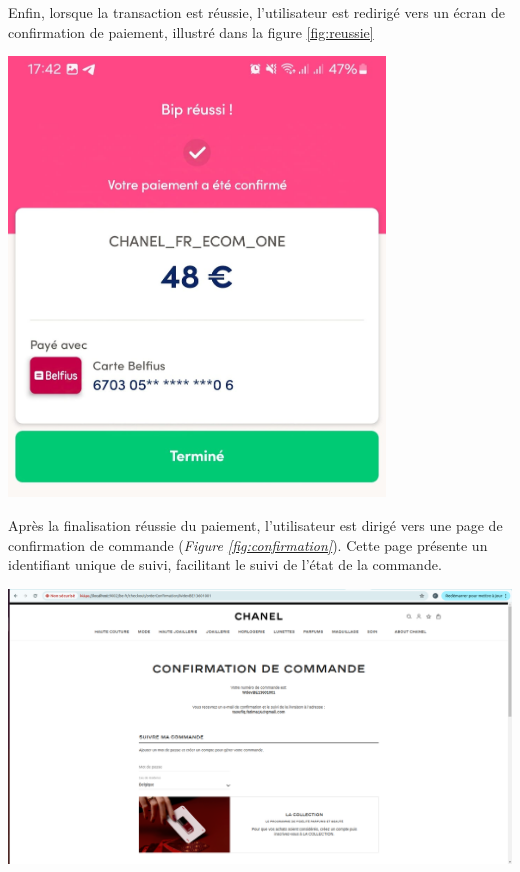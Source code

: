 Enfin, lorsque la transaction est réussie, l'utilisateur est redirigé vers un écran de confirmation de paiement, illustré dans la figure \ref{fig:reussie}
\begin{center}
    \centering
    \includegraphics[width=10cm]{Figures/Screens/reussi.jpeg}
    \label{fig:reussie}
\end{center}
Après la finalisation réussie du paiement, l'utilisateur est dirigé vers une page de confirmation de commande (\textit{Figure \ref{fig:confirmation}}). Cette page présente un identifiant unique de suivi, facilitant le suivi de l'état de la commande. 
\begin{center}
    \centering
    \includegraphics[width=19cm]{Figures/Screens/confirmation du commande.png}
    \label{fig:confirmation}
\end{center}
